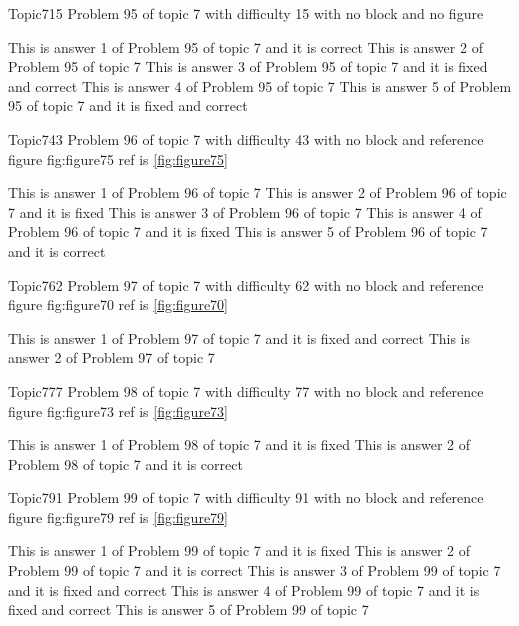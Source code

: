 \documentclass[master]{exam}
\begin{document}
\begin{problem}{Topic7}{15}
	Problem 95 of topic 7 with difficulty 15 with no block and no figure
	\begin{answers}
		\answer[correct] This is answer 1 of Problem 95 of topic 7 and it is correct
		\answer This is answer 2 of Problem 95 of topic 7 
		 This is answer 3 of Problem 95 of topic 7 and it is fixed and correct
		\answer This is answer 4 of Problem 95 of topic 7 
		 This is answer 5 of Problem 95 of topic 7 and it is fixed and correct
	\end{answers}
\end{problem}

\begin{problem}{Topic7}{43}
	Problem 96 of topic 7 with difficulty 43 with no block and reference figure fig:figure75 ref is \ref{fig:figure75}
	\begin{answers}
		\answer This is answer 1 of Problem 96 of topic 7 
		\answer[fixed] This is answer 2 of Problem 96 of topic 7 and it is fixed
		\answer This is answer 3 of Problem 96 of topic 7 
		\answer[fixed] This is answer 4 of Problem 96 of topic 7 and it is fixed
		\answer[correct] This is answer 5 of Problem 96 of topic 7 and it is correct
	\end{answers}
\end{problem}

\begin{problem}{Topic7}{62}
	Problem 97 of topic 7 with difficulty 62 with no block and reference figure fig:figure70 ref is \ref{fig:figure70}
	\begin{answers}
		 This is answer 1 of Problem 97 of topic 7 and it is fixed and correct
		\answer This is answer 2 of Problem 97 of topic 7 
	\end{answers}
\end{problem}

\begin{problem}{Topic7}{77}
	Problem 98 of topic 7 with difficulty 77 with no block and reference figure fig:figure73 ref is \ref{fig:figure73}
	\begin{answers}
		\answer[fixed] This is answer 1 of Problem 98 of topic 7 and it is fixed
		\answer[correct] This is answer 2 of Problem 98 of topic 7 and it is correct
	\end{answers}
\end{problem}

\begin{problem}{Topic7}{91}
	Problem 99 of topic 7 with difficulty 91 with no block and reference figure fig:figure79 ref is \ref{fig:figure79}
	\begin{answers}
		\answer[fixed] This is answer 1 of Problem 99 of topic 7 and it is fixed
		\answer[correct] This is answer 2 of Problem 99 of topic 7 and it is correct
		 This is answer 3 of Problem 99 of topic 7 and it is fixed and correct
		 This is answer 4 of Problem 99 of topic 7 and it is fixed and correct
		\answer This is answer 5 of Problem 99 of topic 7 
	\end{answers}
\end{problem}
\end{document}
